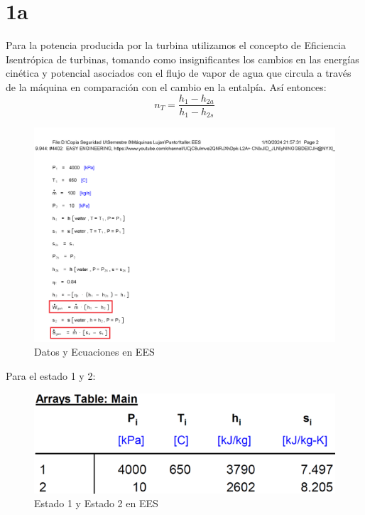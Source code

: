 \documentclass{article}
\theoremstyle{mytheoremstyle}
\theoremstyle{mytheoremstyle}
\theoremstyle{myproblemstyle}
\begin{document}
    \section{1a}
    Para la potencia producida por la turbina utilizamos el concepto de Eficiencia Isentrópica de turbinas, tomando como insignificantes los cambios en las energías cinética y potencial asociados con
    el flujo de vapor de agua que circula a través de la máquina en comparación con el cambio en la entalpía. Así entonces:
    \begin{equation*}
        n_T = \frac{h_1-h_{2a}}{h_1-h_{2s}}
        \end{equation*}        
        \begin{figure}[H] %
            \centering
            \includegraphics[width=1\textwidth]{equations.png} %
            \caption{Datos y Ecuaciones en EES}
            \label{fig:mi_imagen}
        \end{figure}
        \newpage
        Para el estado 1 y 2:
        \begin{figure}[h!] %
            \centering
            \includegraphics[width=1\textwidth]{arrays1.png} %
            \caption{Estado 1 y Estado 2 en EES}
            \label{fig:mi_imagen}
        \end{figure}
\end{document}
